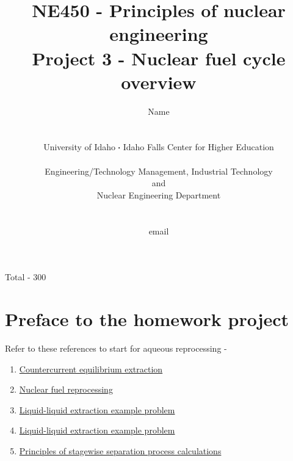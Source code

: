 \documentclass[11pt,a4paper]{article}
\newcommand*\sq{\mathbin{\vcenter{\hbox{\rule{.3ex}{.3ex}}}}} %
\begin{document}
\begin{titlepage}
    \title{
        NE450 - Principles of nuclear engineering\\
        Project 3 - Nuclear fuel cycle overview\\
    }
    \author{
        Name
        \\ \\ \\
        University of Idaho $\sq$ Idaho Falls Center for Higher Education
        \\ \\
        Engineering/Technology Management, Industrial Technology\\and\\Nuclear Engineering Department
        \\ \\ \\
        email 
    }
\clearpage %
\maketitle
\vspace*{\fill}
\begin{flushright}{
        Total - 300 
}
\end{flushright}
\thispagestyle{empty} %
\end{titlepage}

\section{Preface to the homework project}

\noindent Refer to these references to start for aqueous reprocessing -
\begin{enumerate}[leftmargin=*,topsep=0pt,font=\bfseries]
    \item\href{../homework-resources/countercurrent-equilibrium-extraction.pdf}{Countercurrent equilibrium extraction}
    \item\href{../homework-resources/nuclear-fuel-reprocessing.pdf}{Nuclear fuel reprocessing}
    \item\href{https://youtu.be/HGwHLaPhw30}{Liquid-liquid extraction example problem}
    \item\href{https://youtu.be/vK8XGYwnZv4}{Liquid-liquid extraction example problem}
    \item\href{../homework-resources/principles-stagewise-separation-process-calculations.pdf}{Principles of stagewise separation process calculations}
\end{enumerate}
\vspace{\baselineskip}
\end{document}
